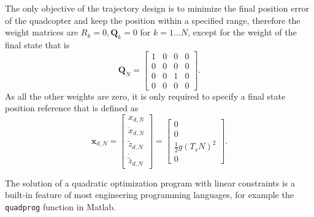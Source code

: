 The only objective of the trajectory design is to minimize the final position error of the quadcopter and keep the position within a specified range, therefore the weight matrices are $R_k = 0, \mathbf Q_k=0$ for $k=1\dots N$, except for the weight of the final state that is
\begin{equation}
\mathbf Q_N = \begin{bmatrix} 1 & 0 & 0 & 0 \\ 0 & 0 & 0 & 0 \\ 0 & 0 & 1 & 0 \\ 0 & 0 & 0 & 0 \end{bmatrix}.
\end{equation}
As all the other weights are zero, it is only required to specify a final state position reference that is defined as
\begin{equation}
    \mathbf x_{d,N} = \begin{bmatrix} x_{d,N} \\ \dot{x}_{d,N} \\ {\tilde{z}}_{d,N} \\ \dot{\tilde{z}}_{d,N} \end{bmatrix} = \begin{bmatrix} 0 \\ 0 \\ \frac{1}{2}g(T_s N)^2 \\ 0 \end{bmatrix}.
\end{equation}

The solution of a quadratic optimization program with linear constraints is a built-in feature of most engineering programming languages, for example the \verb+quadprog+ function in Matlab. 